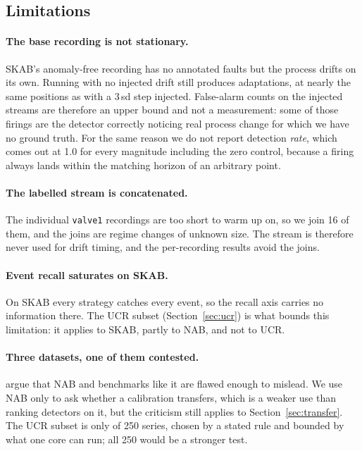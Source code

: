 \subsection{Limitations}
\label{sec:limitations}

\paragraph{The base recording is not stationary.} SKAB's anomaly-free recording
has no annotated faults but the process drifts on its own. Running with no
injected drift still produces adaptations, at nearly the same positions as with a
3\,sd step injected. False-alarm counts on the injected streams are therefore an
upper bound and not a measurement: some of those firings are the detector
correctly noticing real process change for which we have no ground truth. For
the same reason we do not report detection \emph{rate}, which comes out at 1.0
for every magnitude including the zero control, because a firing always lands
within the matching horizon of an arbitrary point.

\paragraph{The labelled stream is concatenated.} The individual \texttt{valve1}
recordings are too short to warm up on, so we join 16 of them, and the joins are
regime changes of unknown size. The stream is therefore never used for drift
timing, and the per-recording results avoid the joins.

\paragraph{Event recall saturates on SKAB.} On SKAB every strategy catches every
event, so the recall axis carries no information there. The UCR subset
(Section~\ref{sec:ucr}) is what bounds this limitation: it applies to SKAB,
partly to NAB, and not to UCR.

\paragraph{Three datasets, one of them contested.} \citet{wu2023flawed} argue
that NAB and benchmarks like it are flawed enough to mislead. We use NAB only to
ask whether a calibration transfers, which is a weaker use than ranking
detectors on it, but the criticism still applies to Section~\ref{sec:transfer}.
The UCR subset is only \NUcrSeries{} of 250 series, chosen by a stated rule
and bounded by what one core can run; all 250 would be a stronger test.

